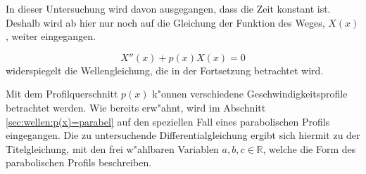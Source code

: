 In dieser Untersuchung wird davon ausgegangen, dass die Zeit konstant ist. 
Deshalb wird ab hier nur noch auf die Gleichung der Funktion des Weges, $X(x)$, 
weiter eingegangen.

\begin{equation*}
	X''(x) + p(x) X(x) = 0
\end{equation*}
widerspiegelt die Wellengleichung, die in der Fortsetzung betrachtet wird.

Mit dem Profilquerschnitt $p(x)$ k"onnen verschiedene Geschwindigkeitsprofile 
betrachtet werden. Wie bereits erw"ahnt, wird im Abschnitt 
\ref{sec:wellen:p(x)=parabel} auf den speziellen Fall eines parabolischen 
Profils eingegangen. Die zu untersuchende Differentialgleichung ergibt sich 
hiermit zu der Titelgleichung, mit den frei w"ahlbaren Variablen ${a,b,c} \in 
\mathbb{R}$, welche die Form des parabolischen Profils beschreiben.